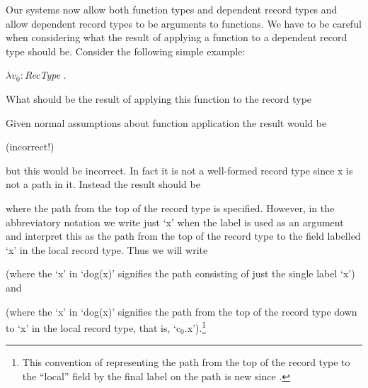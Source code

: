 Our systems now allow both function types and dependent record types
and allow dependent record types to be arguments to functions.  We
have to be careful when considering what the result of applying a
function to a dependent record type should be.  Consider the following
simple example:
\begin{display}
$\lambda
v_0:$\textit{RecType} . 
\end{display}
What should be the result of applying this function to the record type
\begin{display}
\end{display}
Given normal assumptions about function application the result would
be
\begin{display}
 (incorrect!)
\end{display}
but this would be incorrect.  In fact it is not a well-formed record
type since x is not a path in it.  Instead the result should be 
\begin{display}
\end{display}
where the path from the top of the record type is specified.  However,
in the abbreviatory notation we write just `x' when the label is used
as an argument and interpret this as the path from the top of the
record type to the field labelled `x' in the local record type.  Thus
we will write
\begin{display}
\end{display}
(where the `x' in `dog(x)' signifies the path consisting of just the
single label `x') and
\begin{display}
\end{display}
(where the `x' in `dog(x)' signifies the path from the top of the
record type down to `x' in the local
record type, that is, `c$_0$.x').\footnote{This convention of
  representing the path from the top of the record type to the
  ``local'' field by the final label on the path is new since \cite{Cooper2012}.}


